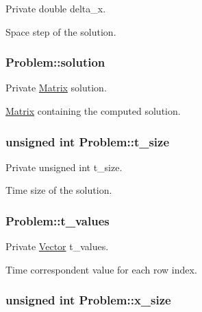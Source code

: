 Private double delta\+\_\+x. 

Space step of the solution. 
\subsubsection[{\texorpdfstring{solution}{solution}}]{ Problem\+::solution\hspace{0.3cm}{\ttfamily [private]}}\hypertarget{classProblem_a2051ea400371fc901151bd5d2826189c}{}\label{classProblem_a2051ea400371fc901151bd5d2826189c}


Private \hyperlink{classMatrix}{Matrix} solution. 

\hyperlink{classMatrix}{Matrix} containing the computed solution. 
\subsubsection[{\texorpdfstring{t\+\_\+size}{t_size}}]{\setlength{\rightskip}{0pt plus 5cm}unsigned int Problem\+::t\+\_\+size\hspace{0.3cm}{\ttfamily [private]}}\hypertarget{classProblem_a66936266b7164a2a2f1af01bc9baccb9}{}\label{classProblem_a66936266b7164a2a2f1af01bc9baccb9}


Private unsigned int t\+\_\+size. 

Time size of the solution. 
\subsubsection[{\texorpdfstring{t\+\_\+values}{t_values}}]{ Problem\+::t\+\_\+values\hspace{0.3cm}{\ttfamily [private]}}\hypertarget{classProblem_a8255789b9dc8cabdd933ddbcf4bd49aa}{}\label{classProblem_a8255789b9dc8cabdd933ddbcf4bd49aa}


Private \hyperlink{classVector}{Vector} t\+\_\+values. 

Time correspondent value for each row index. 
\subsubsection[{\texorpdfstring{x\+\_\+size}{x_size}}]{\setlength{\rightskip}{0pt plus 5cm}unsigned int Problem\+::x\+\_\+size\hspace{0.3cm}{\ttfamily [private]}}\hypertarget{classProblem_afa87f6f37b1b167eb93b9a7655bcd0cc}{}\label{classProblem_afa87f6f37b1b167eb93b9a7655bcd0cc}


